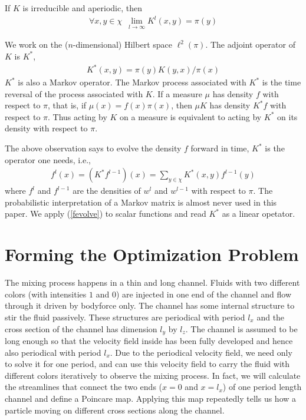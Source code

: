 \documentclass{article}
\begin{document}
If $K$ is irreducible and aperiodic, then
\begin{eqnarray*}
\forall x,y \in \chi \,\,\, \lim_{l \rightarrow \infty}
K^l(x,y)=\pi(y)
\end{eqnarray*}

We work on the ($n$-dimensional) Hilbert space $\ell^2(\pi)$. The adjoint operator of $K$ is $K^*$,
\begin{eqnarray*}
\label{Kadjoint}
  K^*(x,y) = \pi(y)K(y,x)/\pi(x)
\end{eqnarray*}
$K^*$ is also a Markov operator. The Markov process associated with $K^*$ is the time reversal of the process associated with $K$. If a measure $\mu$ has density $f$ with respect to $\pi$, that is, if $\mu(x)=f(x)\pi(x)$, then $\mu K$ has density $K^*f$ with respect to $\pi$. Thus acting by $K$ on a measure is equivalent to acting by
$K^*$ on its density with respect to $\pi$.

The above observation says to evolve the density $f$ forward in time, $K^*$ is the operator one needs, i.e.,
\begin{eqnarray}
\label{fevolve}
f^l(x) =  (K^*f^{l-1})(x)= \sum_{y \in \chi}
K^*(x,y)f^{l-1}(y)
\end{eqnarray}
where $f^l$ and $f^{l-1}$ are the densities of $w^l$ and $w^{l-1}$
with respect to $\pi$. The probabilistic interpretation of a Markov matrix is almost never used in this paper. We apply (\ref{fevolve}) to scalar functions and read $K^*$ as a linear opetator.  

   
\section{Forming the Optimization Problem}
The mixing process happens in a thin and long channel. Fluids with two different colors (with intensities $1$ and $0$) are injected in one end of the channel and flow through it driven by bodyforce only. The channel has some internal structure to stir the fluid passively. These structures are periodical with period $l_x$ and the cross section of the channel has dimension $l_y$ by $l_z$. The channel is assumed to be long enough so that the velocity field inside has been fully developed and hence also periodical with period $l_x$. Due to the periodical velocity field, we need only to solve it for one period, and can use this velocity field to carry the fluid with different colors iteratively to observe the mixing process. In fact, we will calculate the streamlines that connect the two ends ($x=0$ and $x=l_x$) of one period length channel and define a Poincare map. Applying this map repeatedly tells us how a particle moving on different cross sections along the channel.   
\end{document}
